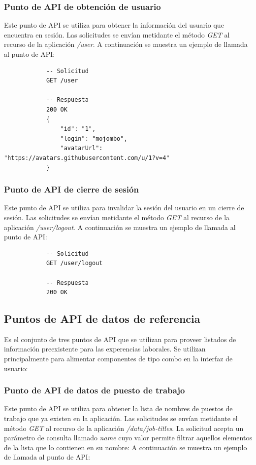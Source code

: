\documentclass[a4paper, 12pt]{book}
\begin{document}
\subsubsection{Punto de API de obtención de usuario}
\label{subsec:get_user}
Este punto de API se utiliza para obtener la información del usuario que encuentra en sesión.
Las solicitudes se envían metidante el método \emph{GET} al recurso de la aplicación \emph{/user}.
A continuación se muestra un ejemplo de llamada al punto de API:

			{\footnotesize
			\begin{verbatim}
			-- Solicitud
			GET /user

			-- Respuesta
			200 OK
			{
			    "id": "1",
			    "login": "mojombo",
			    "avatarUrl": "https://avatars.githubusercontent.com/u/1?v=4"
			}
			\end{verbatim}
			}

\subsubsection{Punto de API de cierre de sesión}
\label{subsec:get_user}
Este punto de API se utiliza para invalidar la sesión del usuario en un cierre de sesión.
Las solicitudes se envían metidante el método \emph{GET} al recurso de la aplicación \emph{/user/logout}.
A continuación se muestra un ejemplo de llamada al punto de API:

			{\footnotesize
			\begin{verbatim}
			-- Solicitud
			GET /user/logout

			-- Respuesta
			200 OK
			\end{verbatim}
			}

\subsection{Puntos de API de datos de referencia}
\label{subsec:reference_endpoints}
Es el conjunto de tres puntos de API que se utilizan para proveer listados de información preexistente para las experencias laborales.
Se utilizan principalmente para alimentar componentes de tipo combo en la interfaz de usuario:

\subsubsection{Punto de API de datos de puesto de trabajo}
\label{subsec:get_data_job_titles}
Este punto de API se utiliza para obtener la lista de nombres de puestos de trabajo que ya existen en la aplicación.
Las solicitudes se envían metidante el método \emph{GET} al recurso de la aplicación \emph{/data/job-titles}.
La solicitud acepta un parámetro de consulta llamado \emph{name} cuyo valor permite filtrar aquellos elementos de la lista que lo contienen en su nombre:
A continuación se muestra un ejemplo de llamada al punto de API:
\end{document}
